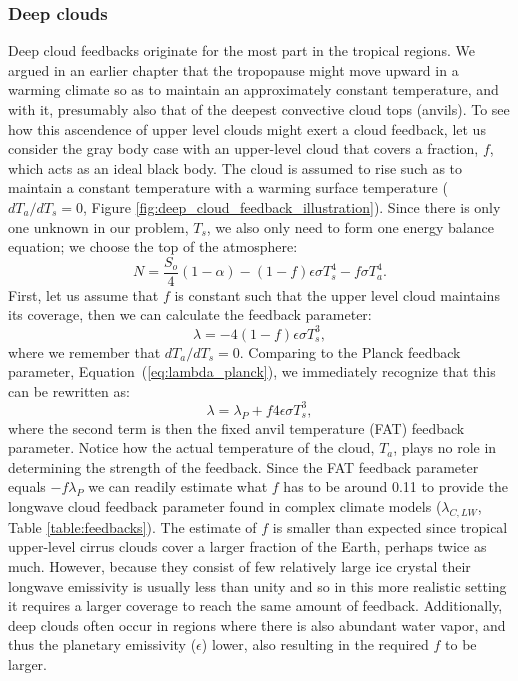 \documentclass[12pt]{book}
\begin{document}
\subsubsection{Deep clouds}
Deep cloud feedbacks originate for the most part in the tropical regions. We argued in an earlier chapter that the tropopause might move upward in a warming climate so as to maintain an approximately constant temperature, and with it, presumably also that of the deepest convective cloud tops (anvils). 
To see how this ascendence of upper level clouds might exert a cloud feedback, let us consider the gray body case with an upper-level cloud that covers a fraction, $f$, which acts as an ideal black body. The cloud is assumed to rise such as to maintain a constant temperature with a warming surface temperature ($dT_a/dT_s=0$, Figure \ref{fig:deep_cloud_feedback_illustration}). Since there is only one unknown in our problem, $T_s$, we also only need to form one energy balance equation; we choose the top of the atmosphere:
\begin{equation}
N = \frac{S_o}{4}(1-\alpha) - (1-f) \epsilon \sigma T_s^4 - f\sigma T_a^4.
\label{eq:anvil_balance}
\end{equation}
First, let us assume that $f$ is constant such that the upper level cloud maintains its coverage, then we can calculate the feedback parameter:
\begin{equation}
\lambda =  - 4(1-f) \epsilon \sigma T_s^3,
\end{equation}
where we remember that $dT_a/dT_s=0$. Comparing to the Planck feedback parameter, Equation (\ref{eq:lambda_planck}), we immediately recognize that this can be rewritten as:
\begin{equation}
\lambda =  \lambda_P + f 4 \epsilon \sigma T_s^3,
\end{equation}
where the second term is then the fixed anvil temperature (FAT) feedback parameter. Notice how the actual temperature of the cloud, $T_a$, plays no role in determining the strength of the feedback. Since the FAT feedback parameter equals $-f\lambda_P$ we can readily estimate what $f$ has to be around 0.11 to provide the longwave cloud feedback parameter found in complex climate models ($\lambda_{C,LW}$, Table \ref{table:feedbacks}). The estimate of $f$ is smaller than expected since tropical upper-level cirrus clouds cover a larger fraction of the Earth, perhaps twice as much. However, because they consist of few relatively large ice crystal their longwave emissivity is usually less than unity and so in this more realistic setting it requires a larger coverage to reach the same amount of feedback. Additionally, deep clouds often occur in regions where there is also abundant water vapor, and thus the planetary emissivity ($\epsilon$) lower, also resulting in the required $f$ to be larger.
\end{document}
